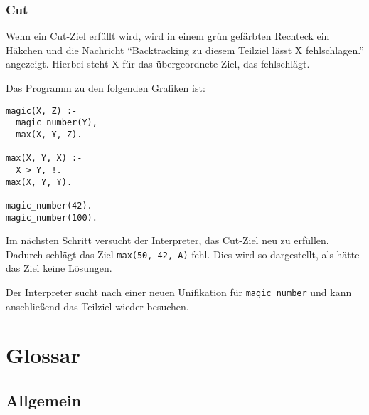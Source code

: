 \documentclass[parskip=full,11pt,twoside]{scrartcl}
\begin{document}
\begin{minipage}{\linewidth}
\end{minipage}

\subsubsection{Cut}

Wenn ein Cut-Ziel erfüllt wird, wird in einem grün gefärbten Rechteck ein Häkchen und die Nachricht \enquote{Backtracking zu diesem Teilziel lässt X fehlschlagen.} angezeigt.
Hierbei steht X für das übergeordnete Ziel, das fehlschlägt.

Das Programm zu den folgenden Grafiken ist:

\begin{lstlisting}
magic(X, Z) :-
  magic_number(Y),
  max(X, Y, Z).

max(X, Y, X) :-
  X > Y, !.
max(X, Y, Y).

magic_number(42).
magic_number(100).
\end{lstlisting}

\begin{minipage}{\linewidth}
\end{minipage}

Im nächsten Schritt versucht der Interpreter, das Cut-Ziel neu zu erfüllen.
Dadurch schlägt das Ziel \texttt{max(50, 42, A)} fehl.
Dies wird so dargestellt, als hätte das Ziel keine Lösungen.

\begin{minipage}{\linewidth}
\end{minipage}

Der Interpreter sucht nach einer neuen Unifikation für \texttt{magic\_number} und kann anschließend das Teilziel wieder besuchen.

\section{Glossar}

\subsection{Allgemein}
\end{document}
